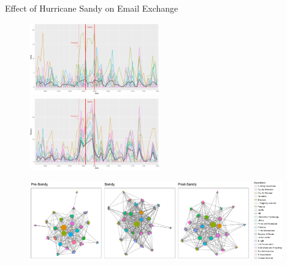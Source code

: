 \documentclass[10pt]{beamer}
\theoremstyle{definition}
\theoremstyle{remark}
\begin{document}
\begin{frame}{Effect of Hurricane Sandy on Email Exchange}
	 	 \begin{figure}
	 	 	\includegraphics[width=0.5\textwidth]{figures/Sendplot.pdf}	 	
	 	 	\includegraphics[width=0.5\textwidth]{figures/Receiveplot.pdf}
	 	 \end{figure}	
	 \begin{figure}
	 		 	\includegraphics[width=0.85\textwidth]{Networkplot.pdf}
	 		 	\hspace{0.1cm}
	 		 		 	\includegraphics[width=0.11\textwidth]{Dept2.jpg}
	 \end{figure}	
\end{frame}
\end{document}
